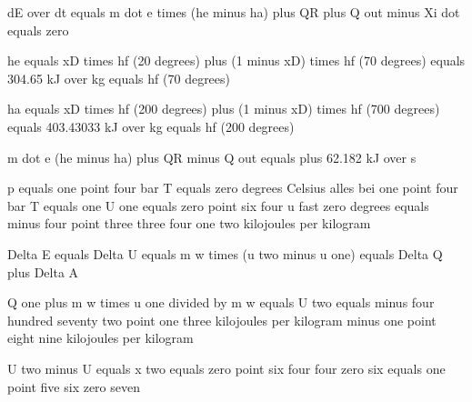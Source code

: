 dE over dt equals m dot e times (he minus ha) plus QR plus Q out minus Xi dot equals zero

he equals xD times hf (20 degrees) plus (1 minus xD) times hf (70 degrees) equals 304.65 kJ over kg equals hf (70 degrees)

ha equals xD times hf (200 degrees) plus (1 minus xD) times hf (700 degrees) equals 403.43033 kJ over kg equals hf (200 degrees)

m dot e (he minus ha) plus QR minus Q out equals plus 62.182 kJ over s

p equals one point four bar  
T equals zero degrees Celsius alles bei one point four bar  
T equals one  
U one equals zero point six four u fast zero degrees equals minus four point three three four one two kilojoules per kilogram  

Delta E equals Delta U equals m w times (u two minus u one) equals Delta Q plus Delta A  

Q one plus m w times u one divided by m w equals U two equals minus four hundred seventy two point one three kilojoules per kilogram minus one point eight nine kilojoules per kilogram  

U two minus U equals x two equals zero point six four four zero six equals one point five six zero seven